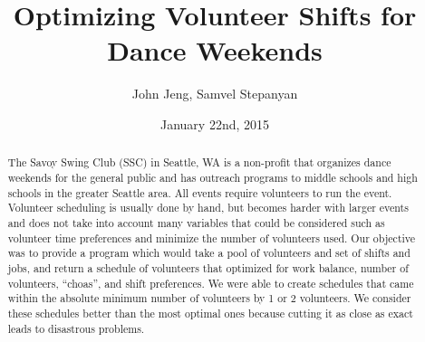 \documentclass[12pt]{article}
\title{Optimizing Volunteer Shifts for Dance Weekends}
\author{John Jeng, Samvel Stepanyan}
\date{January 22nd, 2015}
\theoremstyle{definition}
\begin{document}
\maketitle
\begin{abstract}
	The Savoy Swing Club (SSC) in Seattle, WA is a non-profit that organizes dance weekends for the general public and has outreach programs to middle schools and high schools in the greater Seattle area. All events require volunteers to run the event. Volunteer scheduling is usually done by hand, but becomes harder with larger events and does not take into account many variables that could be considered such as volunteer time preferences and minimize the number of volunteers used. Our objective was to provide a program which would take a pool of volunteers and set of shifts and jobs, and return a schedule of volunteers that optimized for work balance, number of volunteers, ``choas'', and shift preferences. We were able to create schedules that came within the absolute minimum number of volunteers by 1 or 2 volunteers. We consider these schedules better than the most optimal ones because cutting it as close as exact leads to disastrous problems.
\end{abstract}
\noindent\makebox[\linewidth]{\rule{\textwidth}{0.4pt}}
\end{document}

